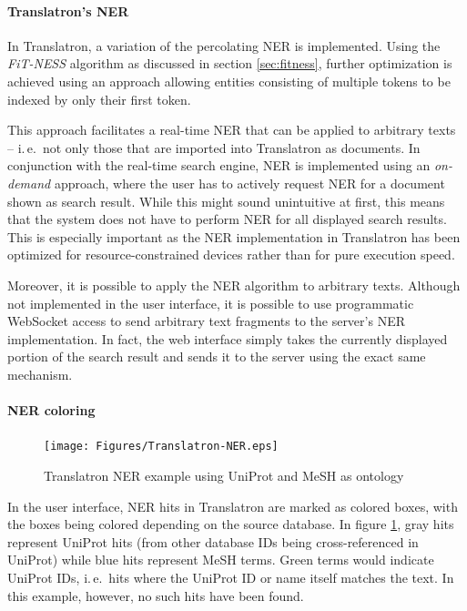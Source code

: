 \documentclass[a4paper, 12pt, twoside, reqn]{report}
\numberwithin{figure}{chapter}
\newtheorem[L]{boxedDefinition}{Definition}
\newtheorem[L]{boxedExample}{Example}
\newcommand{\ie}{i.\,e.\ }
\begin{document}
\paragraph{Translatron's NER}
In Translatron, a variation of the percolating NER is implemented. Using the \textit{FiT-NESS} algorithm as discussed in section \ref{sec:fitness}, further optimization is achieved using an approach allowing entities consisting of multiple tokens to be indexed by only their first token.

This approach facilitates a real-time NER that can be applied to arbitrary texts -- \ie not only those that are imported into Translatron as documents. In conjunction with the real-time search engine, NER is implemented using an \textit{on-demand} approach, where the user has to actively request NER for a document shown as search result. While this might sound unintuitive at first, this means that the system does not have to perform NER for all displayed search results. This is especially important as the NER implementation in Translatron has been optimized for resource-constrained devices rather than for pure execution speed.

Moreover, it is possible to apply the NER algorithm to arbitrary texts. Although not implemented in the user interface, it is possible to use programmatic WebSocket access to send arbitrary text fragments to the server's NER implementation. In fact, the web interface simply takes the currently displayed portion of the search result and sends it to the server using the exact same mechanism.

\paragraph{NER coloring}

\begin{figure}[!htb]
  \centering
  \texttt{[image: Figures/Translatron-NER.eps]}
  \caption[Translatron NER example]{Translatron NER example using UniProt and MeSH as ontology}
  \label{fig:translatron-ner}
\end{figure}

In the user interface, NER hits in Translatron are marked as colored boxes, with the boxes being colored depending on the source database. In figure \ref{fig:translatron-ner}, gray hits represent UniProt hits (from other database IDs being cross-referenced in UniProt) while blue hits represent MeSH terms. Green terms would indicate UniProt IDs, \ie hits where the UniProt ID or name itself matches the text. In this example, however, no such hits have been found.
\end{document}
